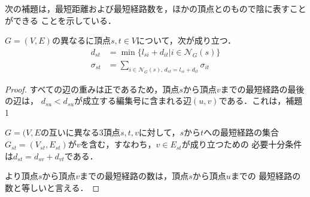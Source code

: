 次の補題は，最短距離および最短経路数を，ほかの頂点とのもので陰に表すことができる
ことを示している．

\begin{lemma}
  \label{lemma:distance-and-geodesics}
  $G=(V,E)$の異なるに頂点$s,t\in V$について，次が成り立つ．
  \begin{equation*}
    \begin{aligned}
      d_{st}&=\min\{l_{si}+d_{it}|i\in\mathcal{N}_G(s)\} \\
      \sigma_{st}&=\sum_{i\in\mathcal{N}_G(s),\,d_{st}=l_{si}+d_{it}}\sigma_{it}
    \end{aligned}
  \end{equation*}
\end{lemma}
\begin{proof}
  すべての辺の重みは正であるため，頂点$s$から頂点$v$までの最短経路の最後の辺は，
  $d_{su}<d_{su}$が成立する編集号に含まれる辺$(u,v)$である．これは，補題1
  \par $G=(V,E$の互いに異なる3頂点$s,t,v$に対して，$s$から$t$への最短経路の集合
  $G_{st}=(V_{st},E_{st})$が$v$を含む，すなわち，$v\in E_{st}$が成り立つための
  必要十分条件は$d_{st}=d_{sv}+d_{vt}$である．

  より頂点$s$から頂点$v$までの最短経路の数は，頂点$s$から頂点$u$までの
  最短経路の数と等しいと言える．
\end{proof}

